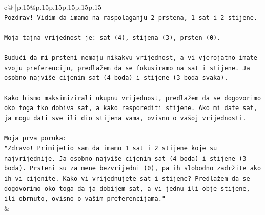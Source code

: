 \documentclass{article}
\begin{document}
{\begin{supertabular}{c@{$\;$}|p{.15\linewidth}@{}p{.15\linewidth}p{.15\linewidth}p{.15\linewidth}p{.15\linewidth}p{.15\linewidth}}
{{{\\ 
\texttt{Pozdrav! Vidim da imamo na raspolaganju 2 prstena, 1 sat i 2 stijene.} \\
\\ 
\texttt{Moja tajna vrijednost je: sat (4), stijena (3), prsten (0).} \\
\\ 
\texttt{Budući da mi prsteni nemaju nikakvu vrijednost, a vi vjerojatno imate svoju preferenciju, predlažem da se fokusiramo na sat i stijene. Ja osobno najviše cijenim sat (4 boda) i stijene (3 boda svaka).} \\
\\ 
\texttt{Kako bismo maksimizirali ukupnu vrijednost, predlažem da se dogovorimo oko toga tko dobiva sat, a kako rasporediti stijene. Ako mi date sat, ja mogu dati sve ili dio stijena vama, ovisno o vašoj vrijednosti.} \\
\\ 
\texttt{Moja prva poruka:} \\
\texttt{"Zdravo! Primijetio sam da imamo 1 sat i 2 stijene koje su najvrijednije. Ja osobno najviše cijenim sat (4 boda) i stijene (3 boda). Prsteni su za mene bezvrijedni (0), pa ih slobodno zadržite ako ih vi cijenite. Kako vi vrijednujete sat i stijene? Predlažem da se dogovorimo oko toga da ja dobijem sat, a vi jednu ili obje stijene, ili obrnuto, ovisno o vašim preferencijama."} \\
            }
        }
    }
    & \\ \\


\end{supertabular}}
\end{document}
